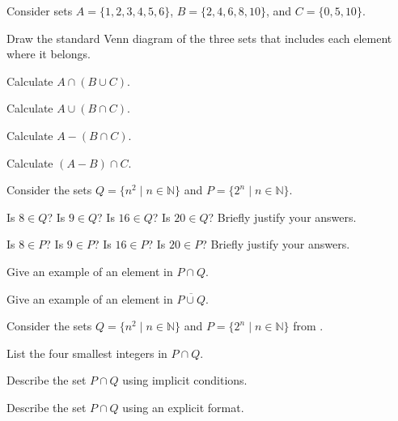 \begin{exer}[\exerP] %
\label{exer_set_ops_3sets}
    Consider sets $A = \{1, 2, 3, 4, 5, 6\}$, $B = \{2, 4, 6, 8, 10\}$, and $C = \{0, 5, 10\}$.
        \begin{exerpart}
            \item Draw the standard Venn diagram of the three sets that includes each element where it belongs.
            \item Calculate $A \cap (B \cup C)$.
            \item Calculate $A \cup (B \cap C)$.
            \item Calculate $A -(B \cap C)$.
            \item Calculate $(A -B) \cap C$.
        \end{exerpart} 
\end{exer}

\begin{exer}[\exerP] %
\label{exer_squares_powers2}
    Consider the sets $Q = \{ n^2 \mid n \in \mathbb{N}\}$ and $P = \{2^n \mid n \in \mathbb{N}\}$. 
        \begin{apart}
            \item Is $8 \in Q$? Is $9 \in Q$? Is $16 \in Q$? Is $20 \in Q$?  Briefly justify your answers.
            \item Is $8 \in P$? Is $9 \in P$? Is $16 \in P$? Is $20 \in P$?  Briefly justify your answers.
            \item Give an example of an element in $P \cap Q$.
            \item Give an example of an element in $\overline{P \cup Q}$.
        \end{apart}
\end{exer}

\begin{exer}[\exerU] %
\label{exer_squares_powers2_int}
    Consider the sets $Q = \{ n^2 \mid n \in \mathbb{N}\}$ and $P = \{2^n \mid n \in \mathbb{N}\}$ from .
        \begin{apart}
            \item List the four smallest integers in $P \cap Q$.  
            \item Describe the set $P \cap Q$ using implicit conditions. 
            \item Describe the set $P \cap Q$ using an explicit format. 
        \end{apart}
\end{exer}

